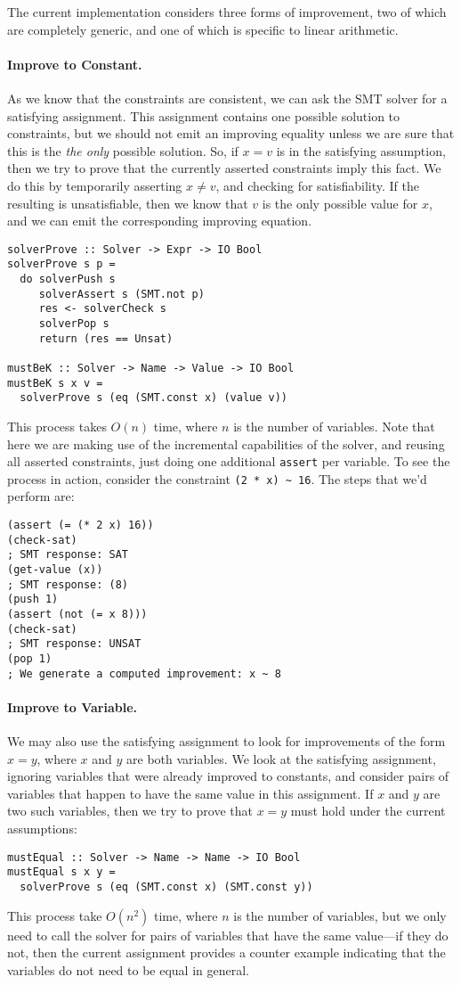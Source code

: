 \documentclass{sigplanconf}
\begin{document}
The current implementation considers three forms of improvement,
two of which are completely generic, and one of which is specific to
linear arithmetic.

\paragraph{Improve to Constant.} As we know that the constraints are
consistent, we can ask the SMT solver for a satisfying assignment.
This assignment contains one possible solution to constraints, but
we should not emit an improving equality unless we are sure that
this is the {\em the only} possible solution.  So, if $x = v$ is
in the satisfying assumption, then we try to prove that the currently
asserted constraints imply this fact.  We do this by temporarily asserting
$x \neq v$, and checking for satisfiability.  If the resulting is unsatisfiable,
then we know that $v$ is the only possible value for $x$,
and we can emit the corresponding improving equation.
\begin{Verbatim}
solverProve :: Solver -> Expr -> IO Bool
solverProve s p =
  do solverPush s
     solverAssert s (SMT.not p)
     res <- solverCheck s
     solverPop s
     return (res == Unsat)

mustBeK :: Solver -> Name -> Value -> IO Bool
mustBeK s x v =
  solverProve s (eq (SMT.const x) (value v))
\end{Verbatim}
This process takes $O(n)$ time, where $n$ is the number of variables.
Note that here we are making use of the incremental capabilities of the
solver, and reusing all asserted constraints, just doing one
additional \Verb"assert" per variable. To see the process in action,
consider the constraint \Verb"(2 * x) ~ 16".  The steps that we'd perform
are:
\begin{Verbatim}
(assert (= (* 2 x) 16))
(check-sat)
; SMT response: SAT
(get-value (x))
; SMT response: (8)
(push 1)
(assert (not (= x 8)))
(check-sat)
; SMT response: UNSAT
(pop 1)
; We generate a computed improvement: x ~ 8
\end{Verbatim}

\paragraph{Improve to Variable.}
We may also use the satisfying assignment to look for improvements of
the form $x = y$, where $x$ and $y$ are both variables.
We look at the satisfying assignment, ignoring variables
that were already improved to constants, and consider pairs of variables
that happen to have the same value in this assignment. If $x$ and $y$
are two such variables, then we try to prove that $x = y$ must hold
under the current assumptions:
\begin{Verbatim}
mustEqual :: Solver -> Name -> Name -> IO Bool
mustEqual s x y =
  solverProve s (eq (SMT.const x) (SMT.const y))
\end{Verbatim}
This process take $O(n^2)$ time, where $n$ is the number of variables,
but we only need to call the solver for pairs of variables that have the same
value---if they do not, then the current assignment provides a counter
example indicating that the variables do not need to be equal in general.
\end{document}
